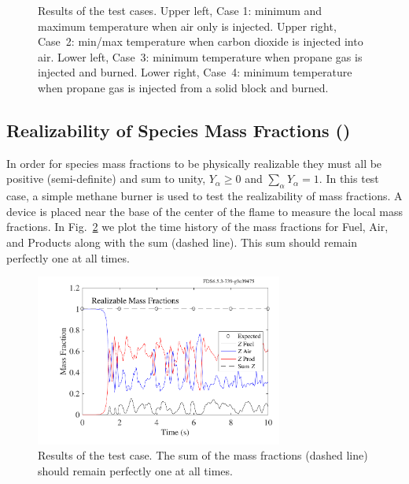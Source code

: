 \documentclass[11pt]{book}
\begin{document}
\begin{figure}[!ht]
\begin{tabular*}{\textwidth}{lr}
\end{tabular*}
\caption[The  test cases]{Results of the  test cases. Upper left, Case 1: minimum and maximum temperature when air only is injected. Upper right, Case~2: min/max temperature when carbon dioxide is injected into air. Lower left, Case~3: minimum temperature when propane gas is injected and burned. Lower right, Case~4: minimum temperature when propane gas is injected from a solid block and burned. }
\label{particle_offgas_plots}
\end{figure}


\subsection{Realizability of Species Mass Fractions (\texorpdfstring{}{realizable\_mass\_fractions})}
\label{realizable_mass_fractions}

In order for species mass fractions to be physically realizable they must all be positive (semi-definite) and sum to unity, $Y_\alpha\ge0$ and $\sum_\alpha Y_\alpha=1$.  In this test case, a simple methane burner is used to test the realizability of mass fractions.  A device is placed near the base of the center of the flame to measure the local mass fractions.  In Fig.~\ref{fig:realizable_mass_fractions} we plot the time history of the mass fractions for Fuel, Air, and Products along with the sum (dashed line).  This sum should remain perfectly one at all times.
\begin{figure}[ht]
\centering
\includegraphics[width=3.2in]{SCRIPT_FIGURES/realizable_mass_fractions}
\caption[The  test case]{Results of the  test case.  The sum of the mass fractions (dashed line) should remain perfectly one at all times.}
\label{fig:realizable_mass_fractions}
\end{figure}
\end{document}
